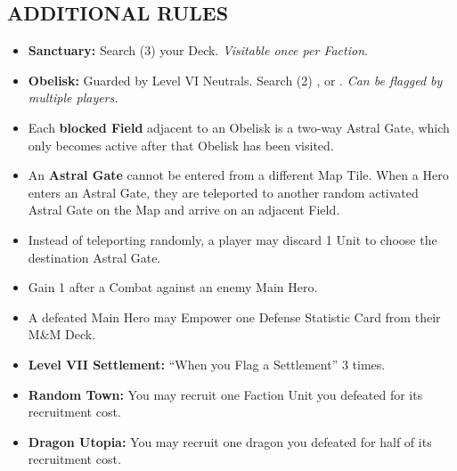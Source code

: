 \begin{multicols}{2}
\subsection*{\MakeUppercase{Additional Rules}}
\begin{itemize}
  \item \textbf{Sanctuary:} Search (3) your Deck. \textit{Visitable once per Faction}.
  \item \textbf{Obelisk:} Guarded by Level VI Neutrals. Search (2) ,  or . \textit{Can be flagged by multiple players.}
  \item Each \textbf{blocked Field} adjacent to an Obelisk is a two-way Astral Gate, which only becomes active after that Obelisk has been visited.
  \item An \textbf{Astral Gate} cannot be entered from a different Map Tile. When a Hero enters an Astral Gate, they are teleported to another random activated Astral Gate on the Map and arrive on an adjacent Field.
  \item Instead of teleporting randomly, a player may discard 1 Unit to choose the destination Astral Gate.
  \item Gain 1  after a Combat against an enemy Main Hero.
  \item A defeated Main Hero may Empower one Defense Statistic Card from their M\&M Deck.
  \item \textbf{Level VII Settlement:} ``When you Flag a Settlement'' 3 times.
  \item \textbf{Random Town:} You may recruit one Faction Unit you defeated for its recruitment cost.
  \item \textbf{Dragon Utopia:} You may recruit one dragon you defeated for half of its recruitment cost.
\end{itemize}

\end{multicols}

